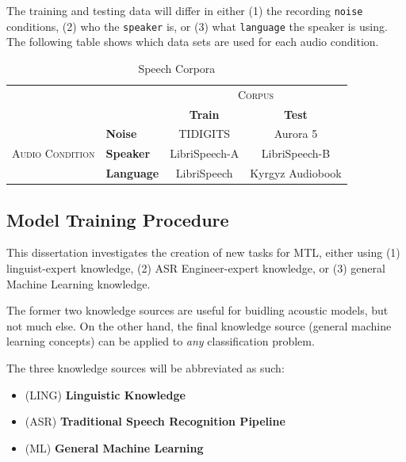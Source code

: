 \documentclass[10pt,a4paper]{article}
\begin{document}
The training and testing data will differ in either (1) the recording \texttt{noise} conditions, (2) who the \texttt{speaker} is, or (3) what \texttt{language} the speaker is using. The following table shows which data sets are used for each audio condition.


\begin{table}[!htbp]
  \centering
  \begin{adjustbox}{width=.75\textwidth}
    \begin{tabular}{clcc}
      \toprule
      && \multicolumn{2}{c}{\textsc{Corpus}}\\
      && \textbf{Train} & \textbf{Test}\\
      \midrule
      \multirow{3}{*}{\textsc{Audio Condition}} &\textbf{Noise} & TIDIGITS & Aurora 5 \\
      &\textbf{Speaker} & LibriSpeech-A & LibriSpeech-B \\
      &\textbf{Language} & LibriSpeech & Kyrgyz Audiobook \\
      \bottomrule
    \end{tabular}
    \label{table:data}
  \end{adjustbox}
  
  \caption{Speech Corpora}
  
\end{table}


\subsection{Model Training Procedure}

This dissertation investigates the creation of new tasks for MTL, either using (1) linguist-expert knowledge, (2) ASR Engineer-expert knowledge, or (3) general Machine Learning knowledge.

The former two knowledge sources are useful for buidling acoustic models, but not much else. On the other hand, the final knowledge source (general machine learning concepts) can be applied to \textit{any} classification problem.

The three knowledge sources will be abbreviated as such:
  
\begin{itemize}
\item  (\textsc{LING}) \textbf{Linguistic Knowledge} 
\item (\textsc{ASR}) \textbf{Traditional Speech Recognition Pipeline}
\item (\textsc{ML}) \textbf{General Machine Learning}
\end{itemize}
\end{document}
